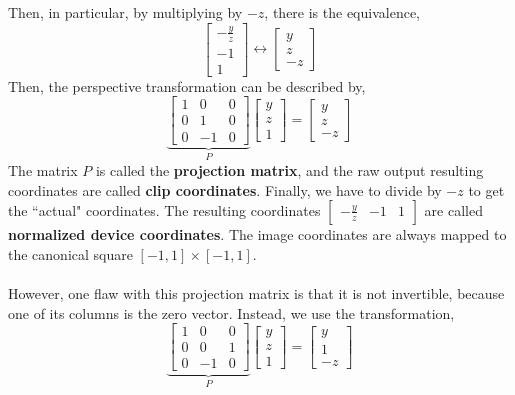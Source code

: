 \documentclass[letterpaper,12pt]{article}
\begin{document}
Then, in particular, by multiplying by $-z$, there is the equivalence,
\begin{equation*}
    \begin{bmatrix} -\frac{y}{z} \\ -1 \\ 1 \end{bmatrix} \longleftrightarrow \begin{bmatrix} y \\ z \\ -z \end{bmatrix}
\end{equation*}
Then, the perspective transformation can be described by,
\begin{equation*}
    \underbrace{\begin{bmatrix} 1 & 0 & 0 \\ 0 & 1 & 0 \\ 0 & -1 & 0 \end{bmatrix}}_P \begin{bmatrix} y \\ z \\ 1 \end{bmatrix} = \begin{bmatrix} y \\ z \\ -z \end{bmatrix}
\end{equation*}
The matrix $P$ is called the \textbf{projection matrix}, and the raw output resulting coordinates are called \textbf{clip coordinates}. Finally, we have to divide by $-z$ to get the ``actual" coordinates. The resulting coordinates $\begin{bmatrix} -\frac{y}{z} & -1 & 1 \end{bmatrix}$ are called \textbf{normalized device coordinates}. The image coordinates are always mapped to the canonical square $[-1,1] \times [-1,1]$.
\\ \\ However, one flaw with this projection matrix is that it is not invertible, because one of its columns is the zero vector. Instead, we use the transformation,
\begin{equation*}
    \underbrace{\begin{bmatrix} 1 & 0 & 0 \\ 0 & 0 & 1 \\ 0 & -1 & 0 \end{bmatrix}}_P \begin{bmatrix} y \\ z \\ 1 \end{bmatrix} = \begin{bmatrix} y \\ 1 \\ -z \end{bmatrix}
\end{equation*}
\end{document}
